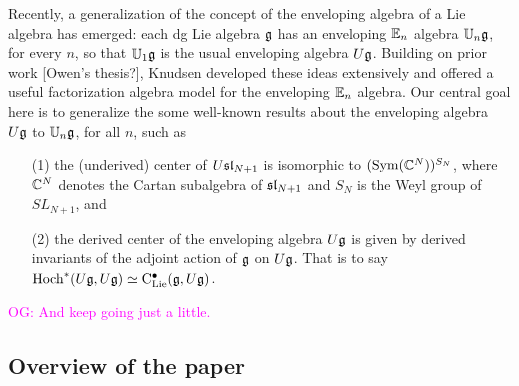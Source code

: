 \documentclass[11pt]{amsart}
\numberwithin{equation}{section}
\def\owen{\textcolor{magenta}{OG: }\textcolor{magenta}}
\begin{document}
Recently, a generalization of the concept of the enveloping algebra of a Lie algebra has emerged: 
each dg Lie algebra $\fg$ has an enveloping $\EE_n$ algebra $\UU_n\fg$, for every $n$, 
so that $\UU_1\fg$ is the usual enveloping algebra $U\fg$. 
Building on prior work \cite{BD, AF} [Owen's thesis?], 
Knudsen \cite{Knudsen} developed these ideas extensively and offered a useful factorization algebra model for the enveloping $\EE_n$ algebra. 
Our central goal here is to generalize the some well-known results about the enveloping algebra $U\fg$ to $\UU_n\fg$, for all $n$, such as
\begin{enumerate}
\item[(1)] the (underived) center of $U\sl_{N+1}$ is isomorphic to $(\Sym(\CC^{N}))^{S_N}$, where $\CC^{N}$ denotes the Cartan subalgebra of $\sl_{N+1}$ and $S_N$ is the Weyl group of $SL_{N+1}$, and
\item[(2)] the derived center of the enveloping algebra $U\fg$ is given by derived invariants of the adjoint action of $\fg$ on $U\fg$. That is to say $\Hoch^*(U\fg,U\fg) \simeq \clies(\fg, U\fg)$.
\end{enumerate}
\owen{And keep going just a little.}
%
%
%

\subsection{Overview of the paper}
\end{document}

